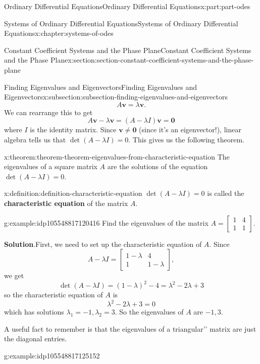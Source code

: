 \documentclass[twoside,10pt,]{book}
\newcommand{\blocktitlefont}{\relax}
\newcommand{\terminology}[1]{\textbf{#1}}
\numberwithin{equation}{part}
\renewcommand{\vec}[1]{\mathbf{#1}}
\newcommand{\amp}{&}
\begin{document}
\begin{partptx}{Ordinary Differential Equations}{}{Ordinary Differential Equations}{}{}{x:part:part-odes}
\begin{chapterptx}{Systems of Ordinary Differential Equations}{}{Systems of Ordinary Differential Equations}{}{}{x:chapter:systems-of-odes}
\begin{sectionptx}{Constant Coefficient Systems and the Phase Plane}{}{Constant Coefficient Systems and the Phase Plane}{}{}{x:section:section-constant-coefficient-systems-and-the-phase-plane}
\begin{subsectionptx}{Finding Eigenvalues and Eigenvectors}{}{Finding Eigenvalues and Eigenvectors}{}{}{x:subsection:subsection-finding-eigenvalues-and-eigenvectors}
\begin{equation*}
A\vec{v} = \lambda\vec{v}.
\end{equation*}
We can rearrange this to get%
\begin{equation*}
A\vec{v}-\lambda\vec{v} = (A-\lambda I)\vec{v} = \vec{0}
\end{equation*}
where \(I\) is the identity matrix. Since \(\vec{v}\neq\vec{0}\) (since it's an eigenvector!), linear algebra tells us that \(\det(A-\lambda I) = 0\). This gives us the following theorem.%
\begin{theorem}{}{}{x:theorem:theorem-theorem-eigenvalues-from-characteristic-equation}%
The eigenvalues of a square matrix \(A\) are the solutions of the equation \(\det(A-\lambda I) = 0\).%
\end{theorem}
\begin{definition}{}{x:definition:definition-characteristic-equation}%
\(\det(A-\lambda I)=0\) is called the \terminology{characteristic equation} of the matrix \(A\).%
\end{definition}
\begin{example}{}{g:example:idp105548817120416}%
Find the eigenvalues of the matrix \(A = \begin{bmatrix}1\amp 4\\1\amp 1\end{bmatrix}\).%
\par\smallskip%
\noindent\textbf{\blocktitlefont Solution}.\hypertarget{g:solution:idp105548817121312}{}\quad{}First, we need to set up the characteristic equation of \(A\). Since%
\begin{equation*}
A-\lambda I = \begin{bmatrix}1-\lambda \amp  4 \\ 1 \amp  1-\lambda\end{bmatrix},
\end{equation*}
we get%
\begin{equation*}
\det(A-\lambda I) = (1-\lambda)^{2} - 4 = \lambda^{2}-2\lambda+3
\end{equation*}
so the characteristic equation of \(A\) is%
\begin{equation*}
\lambda^{2}-2\lambda+3 = 0
\end{equation*}
which has solutions \(\lambda_{1} = -1,\lambda_{2} = 3\). So the eigenvalues of \(A\) are \(-1,3\).%
\end{example}
A useful fact to remember is that the eigenvalues of a \textasciigrave{}\textasciigrave{}triangular'{}'{} matrix are just the diagonal entries.%
\begin{example}{}{g:example:idp105548817125152}%

\end{example}
\end{subsectionptx}
\end{sectionptx}
\end{chapterptx}
\end{partptx}
\end{document}
